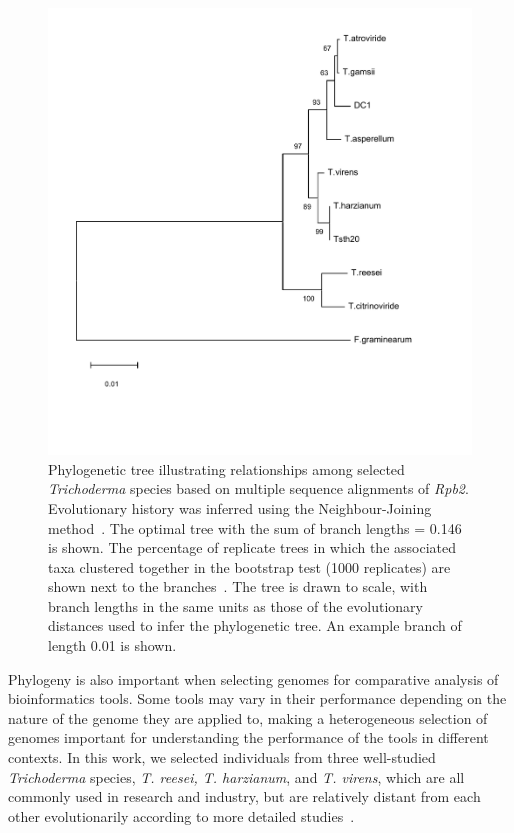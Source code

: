 \begin{figure}
    \centering
    \includegraphics[width=\textwidth]{figures/trichoderma-phylogeny-few-outgroups.pdf}
    \caption[\textit{Trichoderma} Phylogenetic tree]{Phylogenetic tree illustrating relationships among selected \textit{Trichoderma} species based on multiple sequence alignments of \textit{Rpb2}. Evolutionary history was inferred using the Neighbour-Joining method~\cite{Saitou1987}. The optimal tree with the sum of branch lengths = 0.146 is shown. The percentage of replicate trees in which the associated taxa clustered together in the bootstrap test (1000 replicates) are shown next to the branches~\cite{Felsenstein1985}. The tree is drawn to scale, with branch lengths in the same units as those of the evolutionary distances used to infer the phylogenetic tree. An example branch of length 0.01 is shown.}\label{fig:phylogeny}
\end{figure}

Phylogeny is also important when selecting genomes for comparative analysis of bioinformatics tools. Some tools may vary in their performance depending on the nature of the genome they are applied to, making a heterogeneous selection of genomes important for understanding the performance of the tools in different contexts. In this work, we selected individuals from three well-studied \textit{Trichoderma} species, \textit{T. reesei, T. harzianum}, and \textit{T. virens}, which are all commonly used in research and industry, but are relatively distant from each other evolutionarily according to more detailed studies~\cite{an2022}. 


